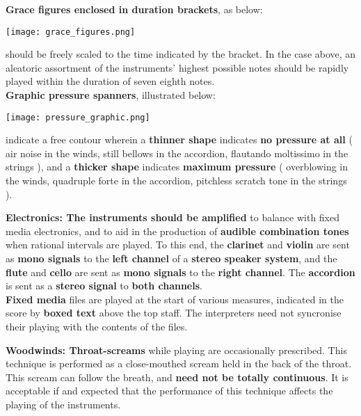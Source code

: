 \documentclass[12pt]{article}
\newcommand*\circled[1]{\tikz[baseline=(char.base)]{
            \node[shape=circle,draw,inner sep=1pt] (char) {#1};}}
\begin{document}
\textbf{\circled{6} Grace figures enclosed in duration brackets}, as below: \\
\begin{center}
\texttt{[image: grace\_figures.png]} \\
\end{center}
should be freely scaled to the time indicated by the bracket. In the case above, an aleatoric assortment of the instruments' highest possible notes should be rapidly played within the duration of seven eighth notes. \\
\textbf{\circled{7} Graphic pressure spanners}, illustrated below:  
\begin{center}
\texttt{[image: pressure\_graphic.png]} \\
\end{center}
indicate a free contour wherein a \textbf{thinner shape} indicates \textbf{no pressure at all} ( air noise in the winds, still bellows in the accordion, flautando moltissimo in the strings ), and a \textbf{thicker shape} indicates \textbf{maximum pressure} ( overblowing in the winds, quadruple forte in the accordion, pitchless scratch tone in the strings ).
\endgroup 


\begingroup
\textbf{Electronics: \circled{1} The instruments should be amplified} to balance with fixed media electronics, and to aid in the production of \textbf{audible combination tones} when rational intervals are played. To this end, the \textbf{clarinet} and \textbf{violin} are sent as \textbf{mono signals} to the \textbf{left channel} of a \textbf{stereo speaker system}, and the \textbf{flute} and \textbf{cello} are sent as \textbf{mono signals} to the \textbf{right channel}. The \textbf{accordion} is sent as a \textbf{stereo signal} to \textbf{both channels}. \\
\textbf{\circled{2} Fixed media} files are played at the start of various measures, indicated in the score by \textbf{boxed text} above the top staff. The interpreters need not syncronise their playing with the contents of the files. \\
\endgroup 

\begingroup
\textbf{Woodwinds: \circled{1} Throat-screams} while playing are occasionally prescribed. This technique is performed as a close-mouthed scream held in the back of the throat. This scream can follow the breath, and \textbf{need not be totally continuous}. It is acceptable if and expected that the performance of this technique affects the playing of the instruments. 
\endgroup 
\end{document}
